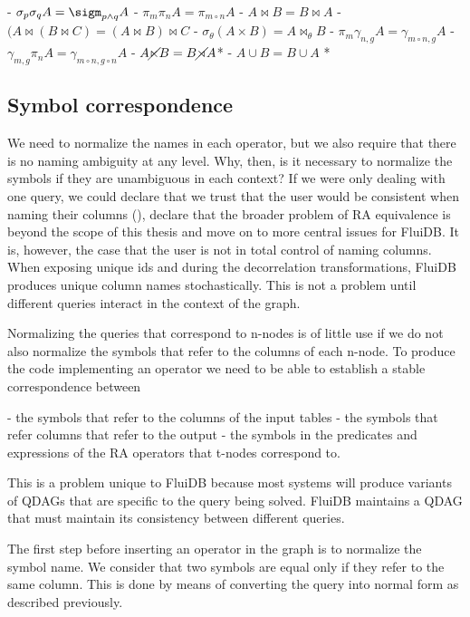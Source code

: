 - \(\sigma_p \sigma_q A = \sigm_{p \land q} A\)
- \(\pi_m \pi_{n} A = \pi_{m \circ n} A\)
- \(A \Join B = B \Join A\)
- \((A \Join (B \Join C) = (A \Join B) \Join C\)
- \(\sigma_\theta (A \times B) = A \Join_\theta B\)
- \(\pi_m \gamma_{n,g} A = \gamma_{m \circ n,g} A \)
- \(\gamma_{m,g} \pi_n A = \gamma_{m \circ n,g \circ n} A \)
- \(A \cancel\ltimes B = B \cancel\rtimes A \)*
- \(A \cup B = B \cup A \) *

\subsection{Symbol correspondence}
\label{sec:symbol_correspondence}

We need to normalize the names in each operator, but we also require
that there is no naming ambiguity at any level. Why, then, is it necessary
to normalize the symbols if they are unambiguous in each context? If
we were only dealing with one query, we could declare that we trust
that the user would be consistent when naming their columns
(), declare that the broader problem
of RA equivalence is beyond the scope of this thesis and move on to
more central issues for FluiDB. It is, however, the case that the user is not in
total control of naming columns. When exposing
unique ids and during the decorrelation transformations, FluiDB
produces unique column names stochastically. This is not a
problem until different queries interact in the context of the
graph.

Normalizing the queries that correspond to n-nodes is of little use
if we do not also normalize the symbols that refer to the columns
of each n-node. To produce the code implementing
an operator we need to be able to establish a stable correspondence 
between 

- the symbols that refer to the columns of the input tables 
- the symbols that refer columns that refer to the output
- the symbols in the predicates and expressions of the RA operators that t-nodes correspond to.

This is a problem unique to FluiDB because most systems will produce
variants of QDAGs that are specific to the query being solved. FluiDB maintains
a QDAG that must maintain its consistency between different queries.

The first step before inserting an operator in the graph is to
normalize the symbol name. We consider that two symbols are equal only
if they refer to the same column. This is done by means of
converting the query into normal form as described previously.

